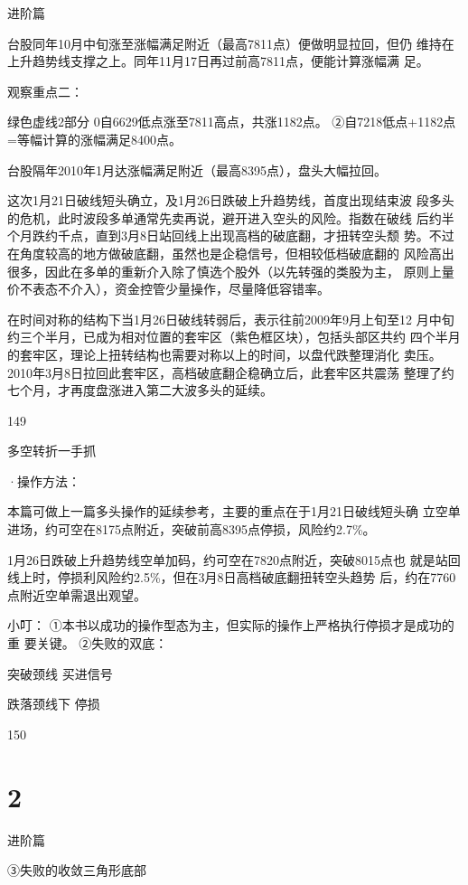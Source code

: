 \documentclass{article}
\begin{document}
\clearpage

进阶篇

台股同年10月中旬涨至涨幅满足附近（最高7811点）便做明显拉回，但仍 维持在上升趋势线支撑之上。同年11月17日再过前高7811点，便能计算涨幅满 足。

观察重点二：

绿色虚线2部分 0自6629低点涨至7811高点，共涨1182点。 ②自7218低点+1182点=等幅计算的涨幅满足8400点。

台股隔年2010年1月达涨幅满足附近（最高8395点），盘头大幅拉回。

这次1月21日破线短头确立，及1月26日跌破上升趋势线，首度出现结束波 段多头的危机，此时波段多单通常先卖再说，避开进入空头的风险。指数在破线 后约半个月跌约千点，直到3月8日站回线上出现高档的破底翻，才扭转空头颓 势。不过在角度较高的地方做破底翻，虽然也是企稳信号，但相较低档破底翻的 风险高出很多，因此在多单的重新介入除了慎选个股外（以先转强的类股为主， 原则上量价不表态不介入），资金控管少量操作，尽量降低容错率。

在时间对称的结构下当1月26日破线转弱后，表示往前2009年9月上旬至12 月中旬约三个半月，已成为相对位置的套牢区（紫色框区块），包括头部区共约 四个半月的套牢区，理论上扭转结构也需要对称以上的时间，以盘代跌整理消化 卖压。2010年3月8日拉回此套牢区，高档破底翻企稳确立后，此套牢区共震荡 整理了约七个月，才再度盘涨进入第二大波多头的延续。

149

\clearpage

多空转折一手抓

·操作方法：

本篇可做上一篇多头操作的延续参考，主要的重点在于1月21日破线短头确 立空单进场，约可空在8175点附近，突破前高8395点停损，风险约2.7\%。

1月26日跌破上升趋势线空单加码，约可空在7820点附近，突破8015点也 就是站回线上时，停损利风险约2.5\%，但在3月8日高档破底翻扭转空头趋势 后，约在7760点附近空单需退出观望。

小叮： ①本书以成功的操作型态为主，但实际的操作上严格执行停损才是成功的重 要关键。 ②失败的双底：

突破颈线 买进信号

跌落颈线下 停损

150

\clearpage

\section{2}

进阶篇

③失败的收敛三角形底部
\end{document}
